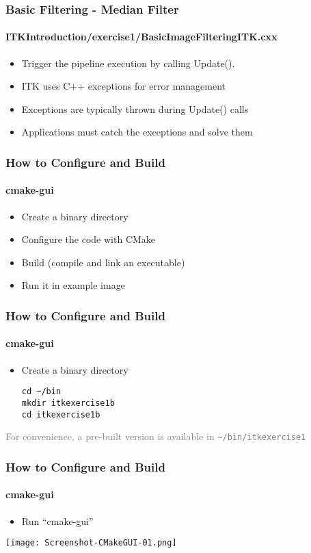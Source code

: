 {
\begin{frame}[fragile]
\frametitle{Basic Filtering - Median Filter}
\framesubtitle{ITKIntroduction/exercise1/BasicImageFilteringITK.cxx}
\begin{itemize}
\item Trigger the pipeline execution by calling Update().
\end{itemize}
\pause
\begin{itemize}
\item ITK uses C++ exceptions for error management
\item Exceptions are typically thrown during Update() calls
\item Applications must catch the exceptions and solve them
\end{itemize}
\end{frame}
}

\begin{frame}
\frametitle{How to Configure and Build}
\framesubtitle{cmake-gui}
\begin{itemize}
\item Create a binary directory
\item Configure the code with CMake
\item Build (compile and link an executable)
\item Run it in example image
\end{itemize}
\end{frame}

\begin{frame}[fragile]
\frametitle{How to Configure and Build}
\framesubtitle{cmake-gui}
\begin{itemize}
\item Create a binary directory
\begin{verbatim}
cd ~/bin
mkdir itkexercise1b
cd itkexercise1b
\end{verbatim}
\end{itemize}
\vspace{1in}
\textcolor{gray}{For convenience, a pre-built version is available in \texttt{\textasciitilde/bin/itkexercise1}}
\end{frame}

\begin{frame}[fragile]
\frametitle{How to Configure and Build}
\framesubtitle{cmake-gui}
\begin{itemize}
\item Run ``cmake-gui''
\end{itemize}
\begin{center}
  \texttt{[image: Screenshot-CMakeGUI-01.png]}
\end{center}
\end{frame}

